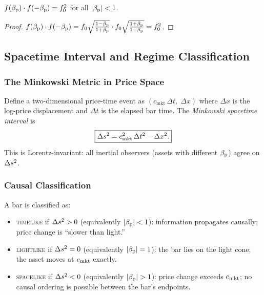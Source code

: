 \begin{proposition}
  \label{prop:doppler_reciprocity}
  $f(\beta_{\mathrm{p}}) \cdot f(-\beta_{\mathrm{p}}) = f_0^2$ for all $|\beta_{\mathrm{p}}| < 1$.
\end{proposition}
\begin{proof}
  $f(\beta_{\mathrm{p}}) \cdot f(-\beta_{\mathrm{p}})
  = f_0 \sqrt{\tfrac{1-\beta_{\mathrm{p}}}{1+\beta_{\mathrm{p}}}} \cdot f_0 \sqrt{\tfrac{1+\beta_{\mathrm{p}}}{1-\beta_{\mathrm{p}}}}
  = f_0^2$.
\end{proof}

\subsection{Spacetime Interval and Regime Classification}
\label{subsec:interval}

\subsubsection{The Minkowski Metric in Price Space}

Define a two-dimensional price-time event as $(c_{\mathrm{mkt}} \, \Delta t,\; \Delta x)$
where $\Delta x$ is the log-price displacement and $\Delta t$ is the elapsed
bar time.  The \emph{Minkowski spacetime interval} is
\begin{equation}
  \boxed{
    \Delta s^2 = c_{\mathrm{mkt}}^2 \, \Delta t^2 - \Delta x^2.
  }
  \label{eq:interval}
\end{equation}
This is Lorentz-invariant: all inertial observers (assets with different
$\beta_{\mathrm{p}}$) agree on $\Delta s^2$.

\subsubsection{Causal Classification}

\begin{definition}
  \label{def:regime}
  A bar is classified as:
  \begin{itemize}
    \item \textsc{timelike} if $\Delta s^2 > 0$ (equivalently $|\beta_{\mathrm{p}}| < 1$):
          information propagates causally; price change is ``slower than light.''
    \item \textsc{lightlike} if $\Delta s^2 = 0$ (equivalently $|\beta_{\mathrm{p}}| = 1$):
          the bar lies on the light cone; the asset moves at $c_{\mathrm{mkt}}$ exactly.
    \item \textsc{spacelike} if $\Delta s^2 < 0$ (equivalently $|\beta_{\mathrm{p}}| > 1$):
          price change exceeds $c_{\mathrm{mkt}}$; no causal ordering is possible between
          the bar's endpoints.
  \end{itemize}
\end{definition}


